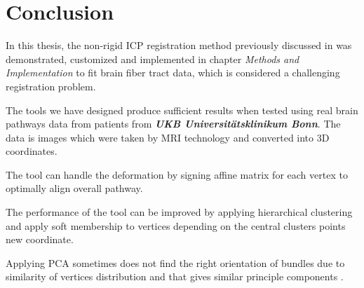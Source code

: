 \documentclass[../structure.tex]{subfiles}
\begin{document}
\chapter{Conclusion}
In this thesis, the non-rigid ICP registration method previously discussed in \cite{Amberg2007} was demonstrated, customized and implemented in chapter \textit{Methods and Implementation} to fit brain fiber tract data, which is considered a challenging registration problem.

The tools we have designed produce sufficient results when tested using real brain pathways data from patients from \textbf{\textit{UKB Universitätsklinikum Bonn}}. The data is images which were taken by MRI technology and converted into 3D coordinates.

The tool can handle the deformation by signing affine matrix for each vertex to optimally align overall pathway.

The performance of the tool can be improved by applying hierarchical clustering and apply soft membership to vertices depending on the central clusters points new coordinate.

Applying PCA sometimes does not find the right orientation of bundles due to similarity of vertices distribution and that gives similar principle components .
\end{document}
